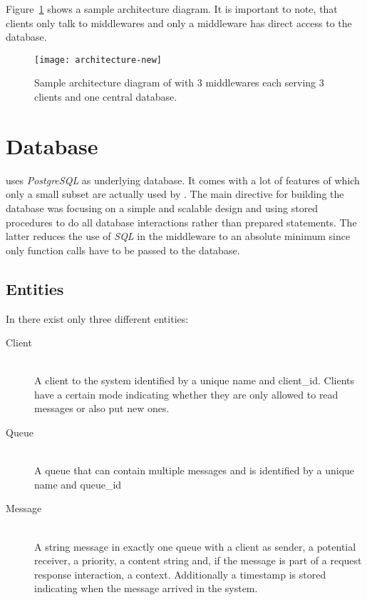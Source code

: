 \documentclass[a4paper, oneside]{csthesis}
\begin{document}
    Figure~\cref{fig:telesto-architecture} shows a sample architecture diagram.
    It is important to note, that clients only talk to middlewares and only a
    middleware has direct access to the database.

    \begin{figure}[h]
        \centering
            \texttt{[image: architecture-new]}
            \caption{Sample architecture diagram of \telesto{} with $3$
            middlewares each serving $3$ clients and one central database.}
            \label{fig:telesto-architecture}
    \end{figure}

\section{Database}
\label{sec:db}
    
    \telesto{} uses {\it PostgreSQL} as underlying database. It comes with a lot
    of features of which only a small subset are actually used by \telesto. The
    main directive for building the database was focusing on a simple and
    scalable design and using stored procedures to do all database interactions
    rather than prepared statements. The latter reduces the use of {\it SQL} in
    the middleware to an absolute minimum since only function calls have to be
    passed to the database.
    
\subsection{Entities}
    In \telesto{} there exist only three different entities:
    
    \begin{description}
    \item[Client] \ \\
        A client to the system identified by a unique name and client\_id.
        Clients have a certain mode indicating whether they are only allowed to
        read messages or also put new ones.
    \item[Queue] \ \\
        A queue that can contain multiple messages and is identified by a unique
        name and queue\_id
    \item[Message] \ \\
        A string message in exactly one queue with a client as sender, a
        potential receiver, a priority, a content string and, if the message is
        part of a request response interaction, a context. Additionally a
        timestamp is stored indicating when the message arrived in the system.
    \end{description}
\end{document}
